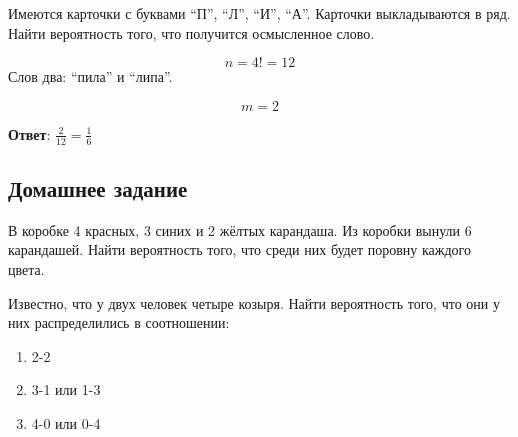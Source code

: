 \begin{exercise}
    Имеются карточки с буквами ``П'', ``Л'', ``И'', ``А''. Карточки выкладываются в ряд. Найти вероятность того, что получится осмысленное слово.

    \[n = 4! = 12\]
    Слов два: ``пила'' и ``липа''.

    \[m = 2\]

    \textbf{Ответ}: \(\frac{2}{12} = \frac{1}{6}\)
\end{exercise}

\subsection*{Домашнее задание}

\begin{exercise}
    В коробке 4 красных, 3 синих и 2 жёлтых карандаша. Из коробки вынули 6 карандашей. Найти вероятность того, что среди них будет поровну каждого цвета.
\end{exercise}

\begin{exercise}
    Известно, что у двух человек четыре козыря. Найти вероятность того, что они у них распределились в соотношении:
    \begin{enumerate}
        \item 2-2
        \item 3-1 или 1-3
        \item 4-0 или 0-4
    \end{enumerate}
\end{exercise}

